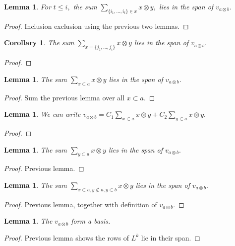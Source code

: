 \documentclass{amsart}
\newtheorem{cor}[subsubsection]{Corollary}
\newtheorem{lem}[subsubsection]{Lemma}
\begin{document}
\begin{lem}
For $t \leq i,$ the sum $\sum_{\{i_1,\ldots, i_t\}\in x}^{}x\otimes y,$ lies in the span of $v_{a\otimes b}.$
\end{lem}
\begin{proof}
Inclusion exclusion using the previous two lemmas.
\end{proof}

\begin{cor}
The sum $\sum_{x = \{j_1,\ldots, j_i\}}^{}x\otimes y$ lies in the span of $v_{a \otimes b}.$
\end{cor}
\begin{proof}

\end{proof}

\begin{lem}
The sum $\sum_{x \subset a}^{}x\otimes y$ lies in the span of $v_{a \otimes b}.$
\end{lem}
\begin{proof}
Sum the previous lemma over all $x \subset a.$
\end{proof}

\begin{lem}
We can write $v_{a\otimes b} = C_1\sum_{x\subset a}^{}x\otimes y + C_2\sum_{y \subset a}^{}x\otimes y.$
\end{lem}
\begin{proof}

\end{proof}

\begin{lem}
The sum $\sum_{y \subset a}^{}x\otimes y$ lies in the span of $v_{a \otimes b}.$
\end{lem}
\begin{proof}
Previous lemma.
\end{proof}

\begin{lem}
The sum $\sum_{x \subset a,y\not\subset a,y\subset b}^{}x\otimes y$ lies in the span of $v_{a \otimes b}.$
\end{lem}
\begin{proof}
Previous lemma, together with definition of $v_{a\otimes b}.$
\end{proof}

\begin{lem}
The $v_{a\otimes b}$ form a basis.
\end{lem}
\begin{proof}
Previous lemma shows the rows of $L^k$ lie in their span.
\end{proof}
\end{document}
